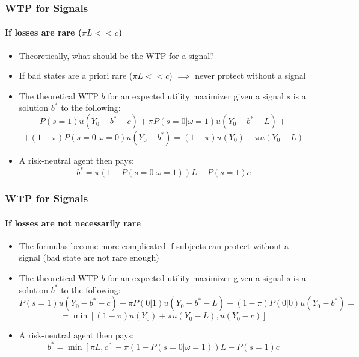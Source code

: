 \documentclass[11pt,hyperref={bookmarks=false}]{beamer}
\begin{document}
\begin{frame}
\frametitle{WTP for Signals}
\framesubtitle{If losses are rare ($\pi L<<c$)}

\begin{itemize}
	\item Theoretically, what should be the WTP for a signal?
	\item If bad states are a priori rare ($\pi L<<c$) $\implies$ never protect without a signal
	\item The theoretical WTP $b$ for an expected utility maximizer given a signal $s$ is a solution $b^*$ to the following:
	\small
		$$P(s=1)u(Y_0-b^*-c) + \pi P(s=0|\omega=1)u(Y_0-b^*-L)+$$
		$$+(1-\pi)P(s=0|\omega=0)u(Y_0-b^*) =(1-\pi)u(Y_0)+\pi u(Y_0-L)$$
\normalsize
	\item A risk-neutral agent then pays:
		\[b^*=\pi(1-P(s=0|\omega=1))L-P(s=1)c\]
\small
\end{itemize}
\end{frame}


\begin{frame}
\frametitle{WTP for Signals}
\framesubtitle{If losses are not necessarily rare}

\begin{itemize}
	\item The formulas become more complicated if subjects can protect without a signal (bad state are not rare enough)
	\item The theoretical WTP $b$ for an expected utility maximizer given a signal $s$ is a solution $b^*$ to the following:
	\small
 $$P(s=1)u(Y_0-b^*-c) + \pi P(0|1)u(Y_0-b^*-L)+(1-\pi)P(0|0)u(Y_0-b^*)=$$
		$$=\min[(1-\pi)u(Y_0)+\pi u(Y_0-L),u(Y_0-c)]$$

	\normalsize
	\item A risk-neutral agent then pays:
\small
		\[b^*=\min[\pi L,c]-\pi(1-P(s=0|\omega=1))L-P(s=1)c\]
\end{itemize}
\end{frame}
\end{document}
